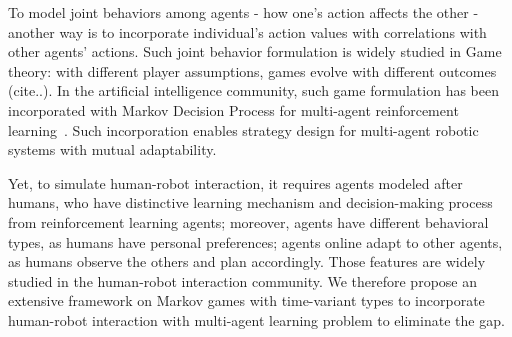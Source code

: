\documentclass[letterpaper, 10 pt, conference]{ieeeconf}  %
\begin{document}


%



To model joint behaviors among agents - how one's action affects the other -  
another way is to incorporate individual's action values with correlations 
with other agents' actions. Such joint behavior formulation is widely studied 
in Game theory: with different player assumptions, games evolve with different 
outcomes (cite..). In the artificial intelligence community, such game 
formulation has been incorporated with Markov Decision Process for multi-agent 
reinforcement learning~\cite{littman1994markov}. Such incorporation enables strategy 
design for multi-agent robotic systems with mutual adaptability. 

Yet, to simulate human-robot interaction, it requires agents modeled after 
humans, who have distinctive learning mechanism and decision-making process 
from reinforcement learning agents; moreover, agents have different behavioral 
types, as humans have personal preferences; agents online adapt to other 
agents, as humans observe the others and plan accordingly. Those features are 
widely studied in the human-robot interaction community. We therefore propose 
an extensive framework on Markov games with time-variant types to incorporate 
human-robot interaction with multi-agent learning problem to eliminate the gap. 
\end{document}
